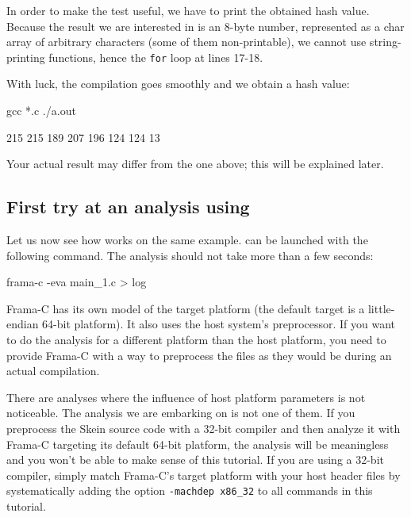 \documentclass{frama-c-book}
\begin{document}
In order to make the test useful, we have to print
the obtained hash value. Because the result we are interested in is
an 8-byte number, represented as a char array of
arbitrary characters (some of them non-printable), we cannot
use string-printing functions, hence the \lstinline|for| loop at lines 17-18.
\goodbreak

With luck, the compilation goes smoothly and we obtain
a hash value:
\begin{frama-c-commands}
gcc *.c
./a.out
\end{frama-c-commands}

\begin{logs}
215
215
189
207
196
124
124
13
\end{logs}

\begin{important}
  Your actual result may differ from the one above;
  this will be explained later.
\end{important}

\subsection{First try at an analysis using \Eva{}}

Let us now see how \Eva{} works on the same example.
\Eva{} can be launched with the following command.
The analysis should not take more than a few seconds:
\begin{frama-c-commands}
frama-c -eva main_1.c > log
\end{frama-c-commands}

Frama-C has its own model of the target platform (the default target is
a little-endian 64-bit platform). It also uses the host system's preprocessor.
If you want to do the analysis for a different platform than the host platform,
you need to provide Frama-C with a way to preprocess the files as they
would be during an actual compilation.

There are analyses where the influence of host platform parameters
is not noticeable. The analysis we are embarking on is not one of them.
If you preprocess the Skein source code with a 32-bit compiler and
then analyze it with Frama-C targeting its default 64-bit platform,
the analysis will be meaningless and you won't be able to make sense of
this tutorial.
If you are using a 32-bit compiler, simply match
Frama-C's target platform with your host header files by systematically adding
the option \verb|-machdep x86_32| to all commands in
this tutorial.
\end{document}
